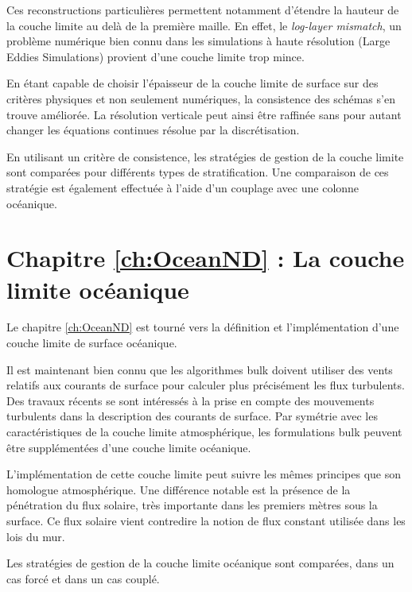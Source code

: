 Ces reconstructions particulières permettent notamment
	d'étendre la hauteur de la couche limite au delà
	de la première maille.
	En effet, le \textit{log-layer mismatch},
	un problème numérique bien connu dans les
	simulations à haute résolution (Large Eddies
	Simulations)
	provient d'une couche limite trop mince.
\par
En étant capable de choisir l'épaisseur de la couche
	limite de surface sur des critères physiques et non
	seulement numériques, la consistence des schémas
	s'en trouve améliorée. La résolution verticale
	peut ainsi être raffinée sans pour autant changer
	les équations continues résolue par la
			discrétisation.
\par
En utilisant un critère de consistence, les stratégies
	de gestion de la couche limite sont
	comparées pour différents types de stratification.
	Une comparaison de ces stratégie est également effectuée
	à l'aide d'un couplage avec une colonne océanique.
\section*{Chapitre \ref{ch:OceanND} : La couche limite océanique}
Le chapitre \ref{ch:OceanND} est tourné vers la définition et l'implémentation
d'une couche limite de surface océanique.
\par
Il est maintenant bien connu que les algorithmes
	bulk doivent utiliser des vents relatifs aux
	courants de surface pour calculer plus précisément
	les flux turbulents.
	Des travaux récents \citep{pelletier_two-sided_2021}
	se sont intéressés à la prise en compte des mouvements
	turbulents dans la description des courants de
	surface. Par symétrie avec les caractéristiques
	de la couche limite atmosphérique, les formulations
	bulk peuvent être supplémentées d'une couche
	limite océanique.
\par
L'implémentation de cette couche limite peut suivre
	les mêmes principes que son homologue atmosphérique.
	Une différence notable est la présence de la
	pénétration du flux solaire, très importante dans
	les premiers mètres sous la surface.
	Ce flux solaire vient contredire la notion de flux
	constant utilisée dans les lois du mur.
\par
Les stratégies de gestion de la couche limite
	océanique sont comparées, dans un cas forcé et
	dans un cas couplé.
